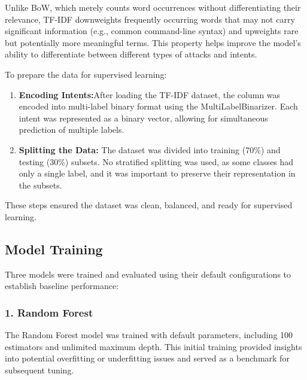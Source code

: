         Unlike BoW, which merely counts word occurrences without differentiating their relevance, TF-IDF downweights frequently occurring words that may not carry significant information (e.g., common command-line syntax) and upweights rare but potentially more meaningful terms. This property helps improve the model's ability to differentiate between different types of attacks and intents.
    
        To prepare the data for supervised learning:

        \begin{enumerate}
    
            \item \textbf{Encoding Intents:}After loading the TF-IDF dataset, the  column was encoded into multi-label binary format using the MultiLabelBinarizer. Each intent was represented as a binary vector, allowing for simultaneous prediction of multiple labels.
            
            \item \textbf{Splitting the Data:} The dataset was divided into training (70\%) and testing (30\%) subsets. No stratified splitting was used, as some classes had only a single label, and it was important to preserve their representation in the subsets.
        
        \end{enumerate}

        These steps ensured the dataset was clean, balanced, and ready for supervised learning.

    \subsection{Model Training}
    
        Three models were trained and evaluated using their default configurations to establish baseline performance:

        \subsubsection*{1. Random Forest \\}
        
        
            The Random Forest model was trained with default parameters, including 100 estimators and unlimited maximum depth. This initial training provided insights into potential overfitting or underfitting issues and served as a benchmark for subsequent tuning.

